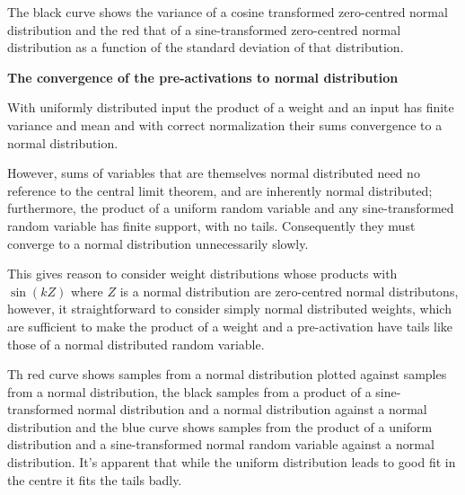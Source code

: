 \documentclass{letter}
\begin{document}
\begin{center}
\end{center}

The black curve shows the variance of a cosine transformed zero-centred normal distribution and the red that of a sine-transformed zero-centred normal distribution as a function of the standard deviation of that distribution.

{\bf The convergence of the pre-activations to normal distribution}

With uniformly distributed input the product of a weight and an input has finite variance and mean and with correct normalization their sums convergence to a normal distribution.

However, sums of variables that are themselves normal distributed need no reference to the central limit theorem, and are inherently normal distributed; furthermore, the product of a uniform random variable and any sine-transformed random variable has finite support, with no tails. Consequently they must converge to a normal distribution unnecessarily slowly.

This gives reason to consider weight distributions whose products with $\sin(kZ)$ where $Z$ is a normal distribution are zero-centred normal distributons, however, it straightforward to consider simply normal distributed weights, which are sufficient to make the product of a weight and a pre-activation have tails like those of a normal distributed random variable.

\begin{center}

\end{center}

Th red curve shows samples from a normal distribution plotted against samples from a normal distribution, the black samples from a product of a sine-transformed normal distribution and a normal distribution against a normal distribution and the blue curve shows samples from the product of a uniform distribution and a sine-transformed normal random variable against a normal distribution. It's apparent that while the uniform distribution leads to good fit in the centre it fits the tails badly.
\end{document}
